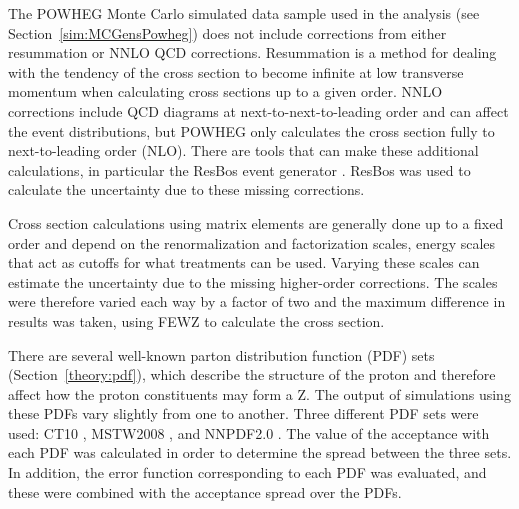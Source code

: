 The POWHEG \cite{powheg} Monte Carlo simulated data sample used in the analysis 
(see Section~\ref{sim:MCGensPowheg}) 
does not include corrections from either resummation or 
NNLO QCD corrections.  
Resummation is a method for dealing with 
the tendency of the cross section 
to become infinite at low transverse momentum 
when calculating cross sections up to a given order.  
NNLO corrections include QCD diagrams at next-to-next-to-leading 
order and can affect the event distributions, 
but POWHEG only calculates the cross section 
fully to next-to-leading order (NLO).  
There are tools that can make these additional calculations, 
in particular the ResBos event generator \cite{resbos}. %
ResBos was used to 
calculate the uncertainty due to these missing corrections.  



Cross section calculations using matrix elements 
are generally done up to a fixed order 
and depend on the renormalization and factorization scales, %
energy scales that act as cutoffs for what 
treatments can be used.  
Varying these scales can estimate the uncertainty due 
to the missing higher-order %
corrections. 
The scales were therefore varied each way by a factor of two 
and the maximum difference in results was taken, 
using FEWZ \cite{FEWZ2} to calculate the cross section.  %



There are several well-known
parton distribution function (PDF) sets
(Section~\ref{theory:pdf}), 
which describe the structure of the proton 
and therefore affect how the proton constituents 
may form a Z.  
The output of simulations
using these PDFs vary slightly from one to another.
Three different PDF sets were used: 
CT10 \cite{CT10}, MSTW2008 \cite{MSTW}, and NNPDF2.0 \cite{NNPDF}.  
The value of the acceptance with each PDF was calculated 
in order to determine the spread between the three sets.  
In addition, the error function corresponding to each PDF 
was evaluated, 
and these were combined with the acceptance spread 
over the PDFs.  


